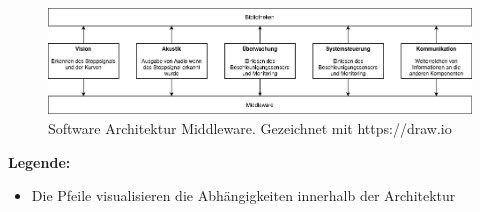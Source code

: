 \documentclass[../../main.tex]{subfiles}
\begin{document}
\begin{figure}[H] %
    \centering
    \includegraphics[width=1.0\textwidth]{../../drawings/ArchitekturDiagramm/SW_Architektur_Middleware.png}
    \caption {Software Architektur Middleware. Gezeichnet mit https://draw.io}
\end{figure}

\textbf{Legende:}
\begin{itemize}
    \item Die Pfeile visualisieren die Abhängigkeiten innerhalb der Architektur
\end{itemize}
\end{document}
